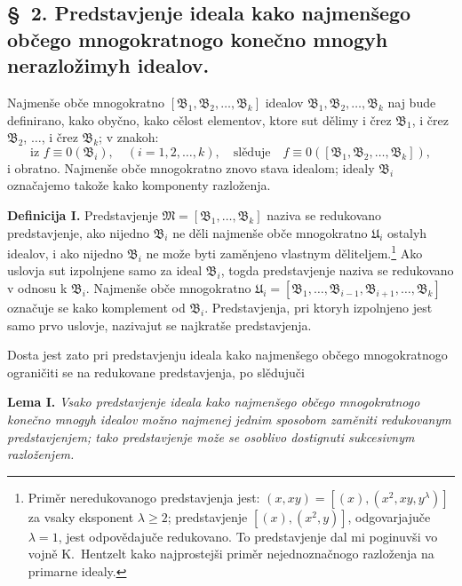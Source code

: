 \documentclass[11pt]{article}
\newcommand{\ideal}[1]{\mathfrak{#1}}
\begin{document}

\setcounter{footnote}{8}
\subsection*{\S~2. Predstavjenje ideala kako najmenšego občego mnogokratnogo konečno mnogyh nerazložimyh idealov.}

Najmenše obče mnogokratno \([\ideal B_1,\ideal B_2,\ldots,\ideal B_k]\) idealov \(\ideal B_1,\ideal B_2,\ldots,\ideal B_k\) naj bude definirano, kako obyčno, kako cělost elementov, ktore sut dělimy i črez \(\ideal B_1\), i črez \(\ideal B_2\), \(\ldots\), i črez \(\ideal B_k\); v znakoh:
\[
 \text{iz } f\equiv0(\ideal B_i),\quad (i=1,2,\ldots,k),
 \quad\text{slěduje}\quad
 f\equiv0([\ideal B_1,\ideal B_2,\ldots,\ideal B_k]),
\]
i obratno. Najmenše obče mnogokratno znovo stava idealom; idealy \(\ideal B_i\) označajemo takože kako komponenty razloženja.

\textbf{Definicija I.} Predstavjenje \(\ideal M=[\ideal B_1,\ldots,\ideal B_k]\) naziva se redukovano predstavjenje, ako nijedno \(\ideal B_i\) ne děli najmenše obče mnogokratno \(\ideal U_i\) ostalyh idealov, i ako nijedno \(\ideal B_i\) ne može byti zaměnjeno vlastnym děliteljem.\footnote{Priměr neredukovanogo predstavjenja jest: \((x,xy)=[(x),(x^2,xy,y^\lambda)]\) za vsaky eksponent \(\lambda\ge2\); predstavjenje \([(x),(x^2,y)]\), odgovarjajuče \(\lambda=1\), jest odpovědajuče redukovano. To predstavjenje dal mi poginuvši vo vojně K.~Hentzelt kako najprostejši priměr nejednoznačnogo razloženja na primarne idealy.} Ako uslovja sut izpolnjene samo za ideal \(\ideal B_i\), togda predstavjenje naziva se redukovano v odnosu k \(\ideal B_i\). Najmenše obče mnogokratno \(\ideal U_i=[\ideal B_1,\ldots,\ideal B_{i-1},\ideal B_{i+1},\ldots,\ideal B_k]\) označuje se kako komplement od \(\ideal B_i\). Predstavjenja, pri ktoryh izpolnjeno jest samo prvo uslovje, nazivajut se najkratše predstavjenja.

Dosta jest zato pri predstavjenju ideala kako najmenšego občego mnogokratnogo ograničiti se na redukovane predstavjenja, po slědujuči

\textbf{Lema I.} \emph{Vsako predstavjenje ideala kako najmenšego občego mnogokratnogo konečno mnogyh idealov možno najmenej jednim sposobom zaměniti redukovanym predstavjenjem; tako predstavjenje može se osoblivo dostignuti sukcesivnym razloženjem.}
\end{document}
